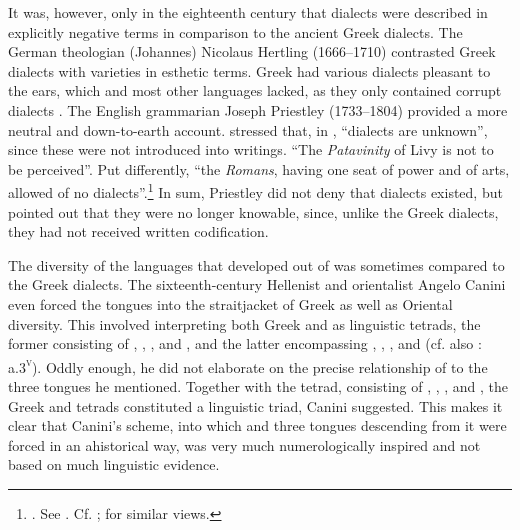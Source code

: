 It was, however, only in the eighteenth century that  dialects were described in explicitly negative terms in comparison to the ancient Greek dialects. The German theologian (Johannes) Nicolaus Hertling (1666–1710) contrasted Greek dialects with  varieties in esthetic terms. Greek had various dialects pleasant to the ears, which  and most other languages lacked, as they only contained corrupt dialects \citep[73]{Hertling1708}. The English grammarian Joseph Priestley (1733–1804) provided a more neutral and down-to-earth account. \citet[138]{Priestley1762} stressed that, in , “dialects are unknown”, since these were not introduced into writings. “The \textit{Patavinity} of Livy is not to be perceived”. Put differently, “the \textit{Romans}, having one seat of power and of arts, allowed of no dialects”.\footnote{\citet[280]{Priestley1762}. See \citet[52]{Amsler1993}. Cf. \citet[49]{Galiani1779}; \citet[203--205]{Ries1786} for similar views.} In sum, Priestley did not deny that  dialects existed, but pointed out that they were no longer knowable, since, unlike the Greek dialects, they had not received written codification.

The diversity of the  languages that developed out of  was sometimes compared to the Greek dialects. The sixteenth-century Hellenist and orientalist Angelo Canini even forced the  tongues into the straitjacket of Greek as well as Oriental diversity. This involved \citet[\textsc{a}.iii\textsc{\textsuperscript{r}}]{Canini1554} interpreting both Greek and  as linguistic tetrads, the former consisting of , , , and , and the latter encompassing , , , and  (cf. also \citealt{Canini1555}: a.3\textsc{\textsuperscript{v}}). Oddly enough, he did not elaborate on the precise relationship of  to the three  tongues he mentioned. Together with the  tetrad, consisting of , , , and , the Greek and  tetrads constituted a linguistic triad, Canini suggested. This makes it clear that Canini’s scheme, into which  and three  tongues descending from it were forced in an ahistorical way, was very much numerologically inspired and not based on much linguistic evidence.

